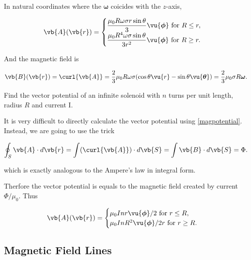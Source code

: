 \documentclass[english,a4paper,12pt]{report}
\begin{document}
{In natural coordinates where the \(\boldsymbol{\omega } \) coicides with the \(z\)-axis, 

\begin{equation}
    \vb{A} (\vb{r} ) = \begin{cases}
        \displaystyle \frac{\mu_0 R\omega \sigma r\sin \theta }{3} \vu{\boldsymbol{\phi } } \text{ for } R \le  r,\\
        \displaystyle \frac{\mu_0 R^4 \omega \sigma \sin \theta }{3r^2} \vu{\boldsymbol{\phi } } \text{ for } R \ge r.
    \end{cases}
\end{equation}

And the magnetic field is 

\begin{equation}
    \vb{B} (\vb{r} ) = \curl{\vb{A} } = \frac{2}{3} \mu_0 R \omega \sigma (\cos \theta \vu{r} - \sin \theta \vu{\boldsymbol{\theta } }) = \frac{2}{3} \mu_0 \sigma R \boldsymbol{\omega } .   
\end{equation}
}

{Find the vector potential of an infinite solenoid with \(n\) turns per unit length, radius \(R\) and current I.}
{It is very difficult to directly calculate the vector potential using \cref{magpotential}. Instead, we are going to use the trick

\begin{equation}
    \oint_{S} \vb{A} \cdot d\vb{r} = \int (\curl{\vb{A} } ) \cdot d\vb{S} = \int \vb{B} \cdot d\vb{S} = \Phi .
\end{equation}

which is exactly analogous to the Ampere's law in integral form.

Therfore the vector potential is equals to the magnetic field created by current \(\Phi /\mu_0  \). Thus

\begin{equation}
    \vb{A} (\vb{r} ) = \begin{cases}
        \mu_0 Inr \vu{\boldsymbol{\phi } }/2  \text{ for } r \le R,\\
        \mu_0 InR^2\vu{\boldsymbol{\phi } }/2r  \text{ for } r \ge R.
    \end{cases}
\end{equation}


}


\subsection{Magnetic Field Lines}
\end{document}
